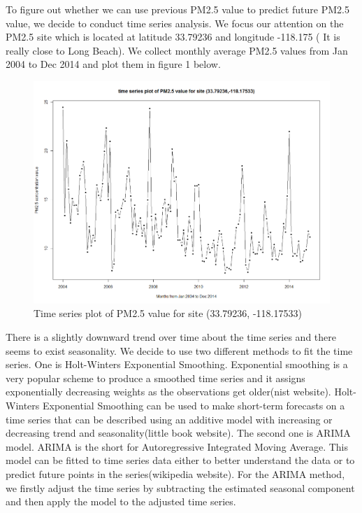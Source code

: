 \documentclass[10pt]{article}
\begin{document}
To figure out whether we can use previous PM2.5 value to predict future PM2.5 value, we decide to conduct time series analysis. We focus our attention on the PM2.5 site which is located at latitude 33.79236 and longitude -118.175 ( It is really close to Long Beach). We collect monthly average PM2.5 values from Jan 2004 to Dec 2014 and plot them in figure 1 below.  

\begin{figure}[H]
\centering
\includegraphics[width = 150mm]{ts1.png}
\caption{Time series plot of PM2.5 value for site (33.79236,	-118.17533)}
\label{graph4}
\end{figure}

There is a slightly downward trend over time about the time series and there seems to exist seasonality. We decide to use two different methods to fit the time series. One is Holt-Winters Exponential Smoothing. Exponential smoothing is a very popular scheme to produce a smoothed time series and it assigns exponentially decreasing weights as the observations get older(nist website). Holt-Winters Exponential Smoothing can be used to make short-term forecasts on a time series that can be described using an additive model with increasing or decreasing trend and seasonality(little book website). The second one is ARIMA model. ARIMA is the short for Autoregressive Integrated Moving Average. This model can be fitted to time series data either to better understand the data or to predict future points in the series(wikipedia website). For the ARIMA method, we firstly adjust the time series by subtracting the estimated seasonal component and then apply the model to the adjusted time series.
\end{document}
